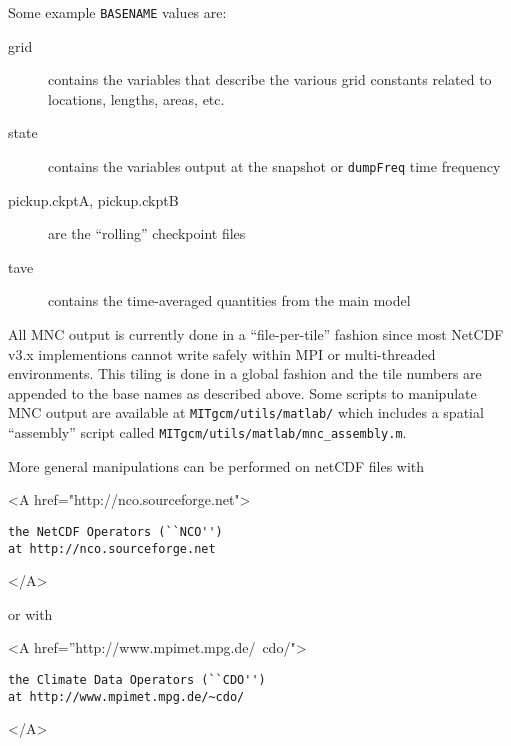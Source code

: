Some example \texttt{BASENAME} values are:
\begin{description}
\item[grid] contains the variables that describe the various grid
  constants related to locations, lengths, areas, etc.
\item[state] contains the variables output at the snapshot or
  \texttt{dumpFreq} time frequency
\item[pickup.ckptA, pickup.ckptB] are the ``rolling'' checkpoint files
\item[tave] contains the time-averaged quantities from the main model
\end{description}

All MNC output is currently done in a ``file-per-tile'' fashion since
most NetCDF v3.x implementions cannot write safely within MPI or
multi-threaded environments.  This tiling is done in a global fashion
and the tile numbers are appended to the base names as described
above.  Some scripts to manipulate MNC output are available at
\texttt{MITgcm/utils/matlab/} which includes a spatial ``assembly''
script called \texttt{MITgcm/utils/matlab/mnc\_assembly.m}.

More general manipulations can be performed on netCDF files with 
\begin{rawhtml} <A href="http://nco.sourceforge.net"> \end{rawhtml} 
\begin{verbatim}
the NetCDF Operators (``NCO'')
at http://nco.sourceforge.net
\end{verbatim}
\begin{rawhtml} </A> \end{rawhtml}
or with
\begin{rawhtml} <A href=''http://www.mpimet.mpg.de/~cdo/"> \end{rawhtml} 
\begin{verbatim}
the Climate Data Operators (``CDO'') 
at http://www.mpimet.mpg.de/~cdo/
\end{verbatim}
\begin{rawhtml} </A> \end{rawhtml}

